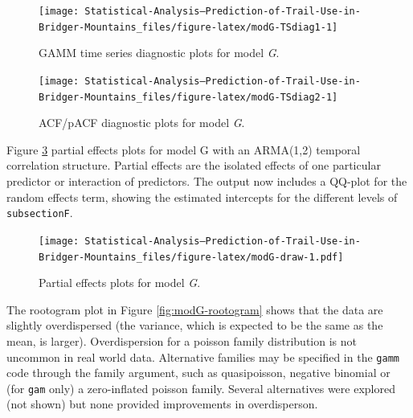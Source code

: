 \documentclass[
]{book}
\newenvironment{Shaded}{\begin{snugshade}}{\end{snugshade}}
\newcommand{\AttributeTok}[1]{\textcolor[rgb]{0.77,0.63,0.00}{#1}}
\newcommand{\FunctionTok}[1]{\textcolor[rgb]{0.00,0.00,0.00}{#1}}
\newcommand{\NormalTok}[1]{#1}
\newcommand{\SpecialCharTok}[1]{\textcolor[rgb]{0.00,0.00,0.00}{#1}}
\begin{document}
\begin{figure}

{\centering \texttt{[image: Statistical-Analysis--Prediction-of-Trail-Use-in-Bridger-Mountains\_files/figure-latex/modG-TSdiag1-1]} 

}

\caption{GAMM time series   diagnostic plots for model \emph{G}.}\label{fig:modG-TSdiag1}
\end{figure}

\begin{figure}

{\centering \texttt{[image: Statistical-Analysis--Prediction-of-Trail-Use-in-Bridger-Mountains\_files/figure-latex/modG-TSdiag2-1]} 

}

\caption{ACF/pACF diagnostic plots for model \emph{G}.}\label{fig:modG-TSdiag2}
\end{figure}

Figure \ref{fig:modG-draw} partial effects plots for model G with an ARMA(1,2) temporal correlation structure. Partial effects are the isolated effects of one particular predictor or interaction of predictors. The output now includes a QQ-plot for the random effects term, showing the estimated intercepts for the different levels of \texttt{subsectionF}.

\begin{Shaded}
\end{Shaded}

\begin{figure}
\centering
\texttt{[image: Statistical-Analysis--Prediction-of-Trail-Use-in-Bridger-Mountains\_files/figure-latex/modG-draw-1.pdf]}
\caption{\label{fig:modG-draw}Partial effects plots for model \emph{G}.}
\end{figure}

The rootogram plot in Figure \ref{fig:modG-rootogram} shows that the data are slightly overdispersed (the variance, which is expected to be the same as the mean, is larger). Overdispersion for a poisson family distribution is not uncommon in real world data. Alternative families may be specified in the \texttt{gamm} code through the family argument, such as quasipoisson, negative binomial or (for \texttt{gam} only) a zero-inflated poisson family. Several alternatives were explored (not shown) but none provided improvements in overdisperson.
\end{document}
